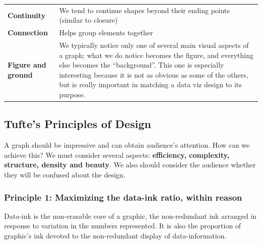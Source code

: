 \documentclass[]{book}
\theoremstyle{definition}
\theoremstyle{definition}
\theoremstyle{definition}
\theoremstyle{remark}
\begin{document}
\begin{longtable}[]{@{}ll@{}}
\begin{minipage}[t]{0.16\columnwidth}\raggedright\strut
\textbf{Continuity}\strut
\end{minipage} & \begin{minipage}[t]{0.78\columnwidth}\raggedright\strut
We tend to continue shapes beyond their ending points (similar to
closure)\strut
\end{minipage}\tabularnewline
\begin{minipage}[t]{0.16\columnwidth}\raggedright\strut
\textbf{Connection}\strut
\end{minipage} & \begin{minipage}[t]{0.78\columnwidth}\raggedright\strut
Helps group elements together\strut
\end{minipage}\tabularnewline
\begin{minipage}[t]{0.16\columnwidth}\raggedright\strut
\textbf{Figure and ground}\strut
\end{minipage} & \begin{minipage}[t]{0.78\columnwidth}\raggedright\strut
We typically notice only one of several main visual aspects of a graph;
what we do notice becomes the figure, and everything else becomes the
``background''. This one is especially interesting because it is not as
obvious as some of the others, but is really important in matching a
data viz design to its purpose.\strut
\end{minipage}\tabularnewline
\bottomrule
\end{longtable}

\subsection{Tufte's Principles of
Design}\label{tuftes-principles-of-design}

A graph should be impressive and can obtain audience's attention. How
can we achieve this? We must consider several aspects:
\textbf{efficiency, complexity, structure, density and beauty}. We also
should consider the audience whether they will be confused about the
design.

\subsubsection{Principle 1: Maximizing the data-ink ratio, within
reason}\label{principle-1-maximizing-the-data-ink-ratio-within-reason}

Data-ink is the non-erasable core of a graphic, the non-redundant ink
arranged in response to variation in the numbers represented. It is also
the proportion of graphic's ink devoted to the non-redundant display of
data-information.
\end{document}
